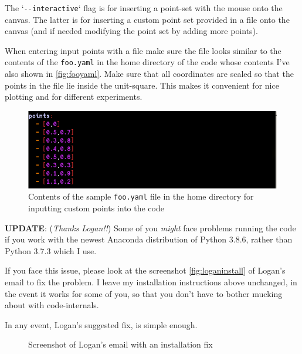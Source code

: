 \begin{appendices}
The `\texttt{\textit{-}\textit{-}interactive}` flag is for inserting a 
point-set with the mouse onto the canvas. The latter is for inserting a 
custom point set provided in a file onto the canvas  (and if needed 
modifying the point set by adding more points). 

When entering input points with a file make sure the file looks similar 
to the contents of the \verb|foo.yaml| in the home directory of the code 
whose contents I've also shown in \autoref{fig:fooyaml}. Make sure that 
all coordinates are scaled so that the points in the file lie inside the unit-square. This makes it convenient 
for nice plotting and for different experiments. 


\begin{figure}[H]
  \centering
  \includegraphics[width=12cm]{miscimages/fooyaml-screenshot.png}
  \caption{\label{fig:fooyaml} Contents of the sample \texttt{foo.yaml} file in the home directory for inputting custom points into the code}
\end{figure}




\begin{mdframed}[backgroundcolor=black!10,rightline=false,leftline=false]
\textbf{UPDATE}: (\textit{Thanks Logan!!}) Some of you \textit{might} face problems running the code if you work with the newest Anaconda distribution
of Python 3.8.6, rather than Python 3.7.3 which I use. 

If you face this issue, please look at the screenshot \autoref{fig:loganinstall} of Logan's email to fix the problem. 
I leave my installation instructions above unchanged, in the event it works for some of you, so that you don't have to bother
mucking about with code-internals. 

In any event, Logan's suggested fix, is simple enough. 
   
\begin{figure}[H]
  \centering
  \caption{\label{fig:loganinstall} Screenshot of Logan's email with an installation fix}
\end{figure}
\end{mdframed}




\end{appendices}
